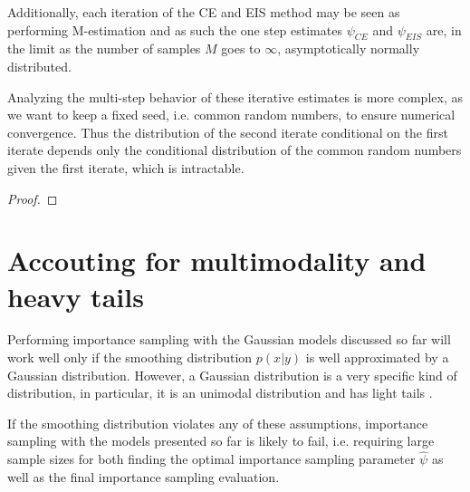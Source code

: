 \begin{tcolorbox}[title={decide what to do}]
Additionally, each iteration of the CE and EIS method may be seen as performing M-estimation and as such the one step estimates $\psi_{CE}$ and $\psi_{EIS}$ are, in the limit as the number of samples $M$ goes to $\infty$, asymptotically normally distributed.

Analyzing the multi-step behavior of these iterative estimates is more complex, as we want to keep a fixed seed, i.e. common random numbers, to ensure numerical convergence. Thus the distribution of the second iterate conditional on the first iterate depends only  the conditional distribution of the common random numbers given the first iterate, which is intractable.

\begin{theorem}
\end{theorem}

\begin{theorem}
\end{theorem}
\begin{proof}
\end{proof}

\end{tcolorbox}

\section{Accouting for multimodality and heavy tails}
\label{sec:accouting_for_multimodality_and_heavy_tails}
Performing importance sampling with the Gaussian models discussed so far will work well only if the smoothing distribution  $p(x|y)$ is well approximated by a Gaussian distribution. However, a Gaussian distribution is a very specific kind of distribution, in particular, it is an unimodal distribution
and has light tails .

If the smoothing distribution violates any of these assumptions, importance sampling with the models presented so far is likely to fail, i.e. requiring large sample sizes for both finding the optimal importance sampling parameter $\hat \psi$ as well as the final importance sampling evaluation.

